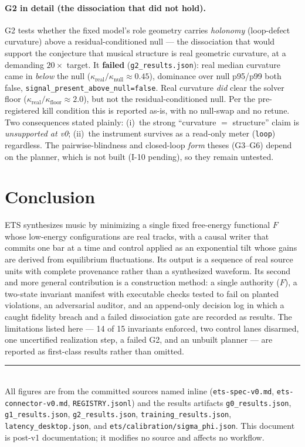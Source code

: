 \documentclass[11pt]{article}
\newcommand{\code}[1]{\texttt{\small #1}}
\begin{document}
\paragraph{G2 in detail (the dissociation that did not hold).} G2 tests whether the
fixed model's role geometry carries \emph{holonomy} (loop-defect curvature) above a
residual-conditioned null --- the dissociation that would support the conjecture
that musical structure is real geometric curvature, at a demanding $20\times$
target. It \textbf{failed} (\code{g2\_results.json}): real median curvature came in
\emph{below} the null ($\kappa_{\text{real}}/\kappa_{\text{null}}\approx0.45$),
dominance over null p95/p99 both false, \code{signal\_present\_above\_null=false}.
Real curvature \emph{did} clear the solver floor
($\kappa_{\text{real}}/\kappa_{\text{floor}}\approx2.0$), but not the
residual-conditioned null. Per the pre-registered kill condition this is reported
as-is, with no null-swap and no retune. Two consequences stated plainly:
(i)~the strong ``curvature $=$ structure'' claim is \emph{unsupported at v0};
(ii)~the instrument survives as a read-only meter (\code{loop}) regardless. The
pairwise-blindness and closed-loop \emph{form} theses (G3--G6) depend on the
planner, which is not built (I-10 pending), so they remain untested.

\section{Conclusion}

ETS synthesizes music by minimizing a single fixed free-energy functional $F$
whose low-energy configurations are real tracks, with a causal writer that
commits one bar at a time and control applied as an exponential tilt whose gains
are derived from equilibrium fluctuations. Its output is a sequence of real source
units with complete provenance rather than a synthesized waveform. Its second and
more general contribution is a construction method: a single authority ($F$), a
two-state invariant manifest with executable checks tested to fail on planted
violations, an adversarial auditor, and an append-only decision log in which a
caught fidelity breach and a failed dissociation gate are recorded as results. The
limitations listed here --- 14 of 15 invariants enforced, two control lanes
disarmed, one uncertified realization step, a failed G2, and an unbuilt planner ---
are reported as first-class results rather than omitted.

\vspace{1em}
\noindent\rule{\linewidth}{0.4pt}\\[0.3em]
{\footnotesize All figures are from the committed sources named inline
(\code{ets-spec-v0.md}, \code{ets-connector-v0.md}, \code{REGISTRY.jsonl}) and the
results artifacts \code{g0\_results.json}, \code{g1\_results.json},
\code{g2\_results.json}, \code{training\_results.json}, \code{latency\_desktop.json},
and \code{ets/calibration/sigma\_phi.json}. This document is post-v1 documentation;
it modifies no source and affects no workflow.}
\end{document}
